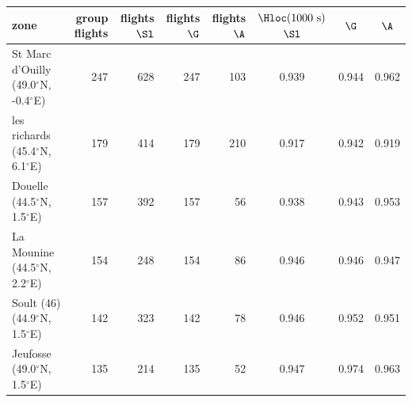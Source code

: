 \begin{tabular}{@{}l r r r r c c c@{}}
\toprule
zone & group flights & flights $\Sl$ & flights $\G$ & flights $\A$ & $\Hloc(1000~\mathrm{s})$ $\Sl$ & $\G$ & $\A$ \\
\midrule
St Marc d'Ouilly (49.0$^\circ$N, -0.4$^\circ$E) & 247 & 628 & 247 & 103 & 0.939 & 0.944 & 0.962 \\
les richards (45.4$^\circ$N, 6.1$^\circ$E) & 179 & 414 & 179 & 210 & 0.917 & 0.942 & 0.919 \\
Douelle (44.5$^\circ$N, 1.5$^\circ$E) & 157 & 392 & 157 & 56 & 0.938 & 0.943 & 0.953 \\
La Mounine (44.5$^\circ$N, 2.2$^\circ$E) & 154 & 248 & 154 & 86 & 0.946 & 0.946 & 0.947 \\
Soult (46) (44.9$^\circ$N, 1.5$^\circ$E) & 142 & 323 & 142 & 78 & 0.946 & 0.952 & 0.951 \\
Jeufosse (49.0$^\circ$N, 1.5$^\circ$E) & 135 & 214 & 135 & 52 & 0.947 & 0.974 & 0.963 \\
\bottomrule
\end{tabular}
